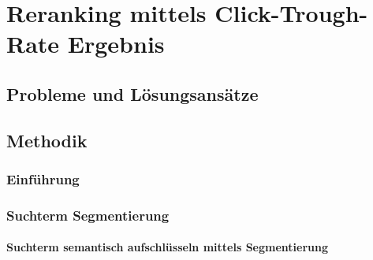 %
\chapter{Reranking mittels Click-Trough-Rate Ergebnis}
\label{sec:Reranking}

\section{Probleme und Lösungsansätze}
\label{sec:Reranking:Probleme}

\section{Methodik}
\label{sec:Reranking:Methodik}

\subsection{Einführung}
\label{sec:Reranking:Methodik:Einfuehrung}

\subsection{Suchterm Segmentierung}
\label{sec:Reranking:Methodik:SuchtermSegmentierung}

\subsubsection{Suchterm semantisch aufschlüsseln mittels Segmentierung}
\label{sec:Reranking:Methodik:SuchtermSegmentierung:SuchtermSegmentierung}

